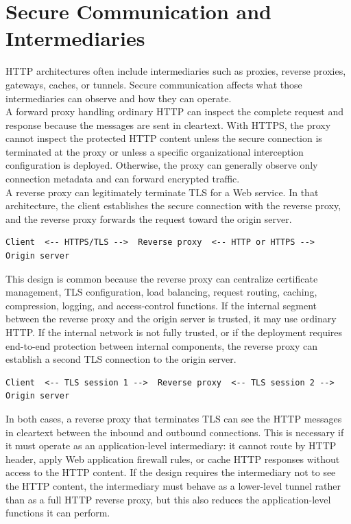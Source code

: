\documentclass{scrbook}
\begin{document}
\section{Secure Communication and Intermediaries}

HTTP architectures often include intermediaries such as proxies, reverse proxies, gateways, caches, or tunnels. Secure communication affects what those intermediaries can observe and how they can operate.\\

A forward proxy handling ordinary HTTP can inspect the complete request and response because the messages are sent in cleartext. With HTTPS, the proxy cannot inspect the protected HTTP content unless the secure connection is terminated at the proxy or unless a specific organizational interception configuration is deployed. Otherwise, the proxy can generally observe only connection metadata and can forward encrypted traffic.\\

A reverse proxy can legitimately terminate TLS for a Web service. In that architecture, the client establishes the secure connection with the reverse proxy, and the reverse proxy forwards the request toward the origin server.

\begin{lstlisting}
Client  <-- HTTPS/TLS -->  Reverse proxy  <-- HTTP or HTTPS -->  Origin server
\end{lstlisting}

This design is common because the reverse proxy can centralize certificate management, TLS configuration, load balancing, request routing, caching, compression, logging, and access-control functions. If the internal segment between the reverse proxy and the origin server is trusted, it may use ordinary HTTP. If the internal network is not fully trusted, or if the deployment requires end-to-end protection between internal components, the reverse proxy can establish a second TLS connection to the origin server.

\begin{lstlisting}
Client  <-- TLS session 1 -->  Reverse proxy  <-- TLS session 2 -->  Origin server
\end{lstlisting}

In both cases, a reverse proxy that terminates TLS can see the HTTP messages in cleartext between the inbound and outbound connections. This is necessary if it must operate as an application-level intermediary: it cannot route by HTTP header, apply Web application firewall rules, or cache HTTP responses without access to the HTTP content. If the design requires the intermediary not to see the HTTP content, the intermediary must behave as a lower-level tunnel rather than as a full HTTP reverse proxy, but this also reduces the application-level functions it can perform.
\end{document}
